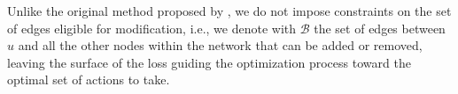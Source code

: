 



Unlike the original method proposed by \citet{bernini2024kdd}, we do not impose constraints on the set of edges eligible for modification, i.e., we denote with $\mathcal{B}$ the set of edges between $u$ and all the other nodes within the network that can be added or removed, leaving the surface of the loss guiding the optimization process toward the optimal set of actions to take.



